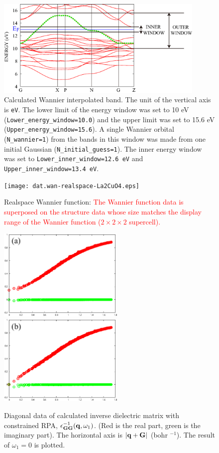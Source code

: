 \documentclass{article}
\newcommand{\tr}[1]{\textcolor{red}{#1}}
\begin{document}
\begin{figure}[h] 
\centering
\includegraphics[width=10cm]{dat.iband.La2CuO4.eps}
\caption{Calculated Wannier interpolated band. The unit of the vertical axis is {\tt eV}. The lower limit of the energy window was set to 10 eV ({\tt Lower\_energy\_window=10.0}) and the upper limit was set to 15.6 eV ({\tt Upper\_energy\_window=15.6}). A single Wannier orbital ({\tt N\_wannier=1}) from the bands in this window was made from one initial Gaussian ({\tt N\_initial\_guess=1}). The inner energy window was set to {\tt Lower\_inner\_window=12.6 eV} and {\tt Upper\_inner\_window=13.4 eV}.}
\label{band-La2CuO4}
\end{figure}
\begin{figure}[H] 
\centering
\texttt{[image: dat.wan-realspace-La2CuO4.eps]}
\caption{Realspace Wannier function: \tr{The Wannier function data is superposed on the structure data whose size matches the display range of the Wannier function ($2\times2\times2$ supercell).}} 
\label{vesta-La2CuO4}
\end{figure}
\begin{figure}[H] 
\centering
\includegraphics[width=6cm]{epsq0-cRPA-La2CuO4.eps}
\includegraphics[width=6cm]{epsq0-fRPA-La2CuO4.eps}
\caption{Diagonal data of calculated inverse dielectric matrix with constrained RPA, $\epsilon_{{\bf GG}}^{-1} ({\bf q}, \omega_1)$. (Red is the real part, green is the imaginary part). The horizontal axis is $|{\bf q+G}|$ (bohr $^{- 1}$). The result of $\omega_1=0$ is plotted.}
\label{epsqw-cRPA-La2CuO4}
\end{figure}
\end{document}
